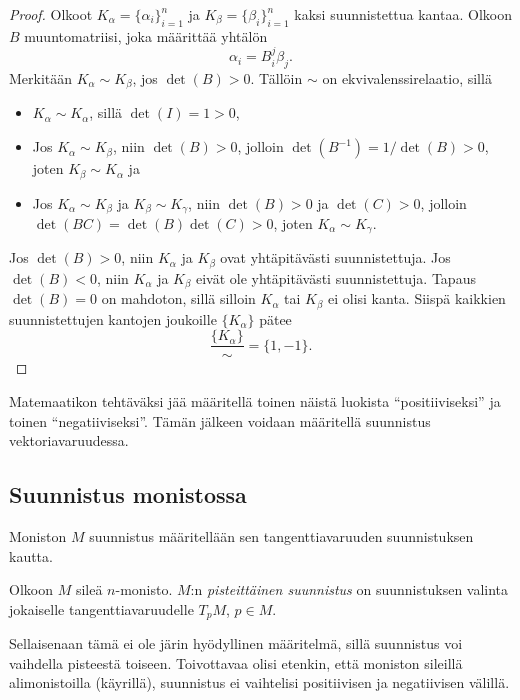 \begin{proof}
    Olkoot $K_\alpha=\{\alpha_i\}_{i=1}^n$ ja $K_\beta=\{\beta_i\}_{i=1}^n$ kaksi suunnistettua kantaa. Olkoon $B$ muuntomatriisi, joka määrittää yhtälön
    \begin{equation*}
        \alpha_i=B_i^j\beta_j.
    \end{equation*}
    Merkitään $K_\alpha\sim K_\beta$, jos $\det(B)>0$. Tällöin $\sim$ on ekvivalenssirelaatio, sillä
    \begin{itemize}
        \item $K_\alpha\sim K_\alpha$, sillä $\det(I)=1>0$,
        \item Jos $K_\alpha\sim K_\beta$, niin $\det(B)>0$, jolloin $\det(B^{-1})=1/\det(B)>0$, joten $K_\beta\sim K_\alpha$ ja
        \item Jos $K_\alpha\sim K_\beta$ ja $K_\beta\sim K_\gamma$, niin $\det(B)>0$ ja $\det(C)>0$, jolloin $\det(BC)=\det(B)\det(C)>0$, joten $K_\alpha\sim K_\gamma$.
    \end{itemize}
    Jos $\det(B)>0$, niin $K_\alpha$ ja $K_\beta$ ovat yhtäpitävästi suunnistettuja. Jos $\det(B)<0$, niin $K_\alpha$ ja $K_\beta$ eivät ole yhtäpitävästi suunnistettuja. Tapaus $\det(B)=0$ on mahdoton, sillä silloin $K_\alpha$ tai $K_\beta$ ei olisi kanta. Siispä kaikkien suunnistettujen kantojen joukoille $\{K_\alpha\}$ pätee
    \begin{equation*}
        \frac{\{K_\alpha\}}{\sim}=\{1,-1\}.
    \end{equation*}
\end{proof}
Matemaatikon tehtäväksi jää määritellä toinen näistä luokista ``positiiviseksi'' ja toinen ``negatiiviseksi''. Tämän jälkeen voidaan määritellä suunnistus vektoriavaruudessa.

\subsection{Suunnistus monistossa}
Moniston $M$ suunnistus määritellään sen tangenttiavaruuden suunnistuksen kautta.
\begin{maaritelma}
    Olkoon $M$ sileä $n$-monisto. $M$:n \emph{pisteittäinen suunnistus} on suunnistuksen valinta jokaiselle tangenttiavaruudelle $T_pM$, $p\in M$.
\end{maaritelma}
Sellaisenaan tämä ei ole järin hyödyllinen määritelmä, sillä suunnistus voi vaihdella pisteestä toiseen. Toivottavaa olisi etenkin, että moniston sileillä alimonistoilla (käyrillä), suunnistus ei vaihtelisi positiivisen ja negatiivisen välillä.

